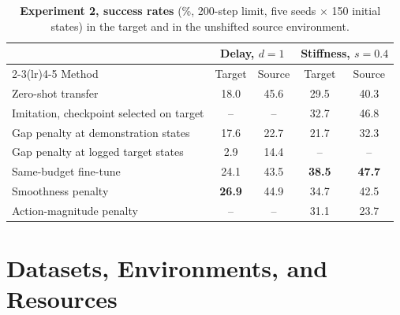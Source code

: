 \begin{table}[t]
  \centering
  \small
  \caption{\textbf{Experiment 2, success rates} (\%, 200-step limit, five seeds $\times$ 150 initial states) in the target and in the unshifted source environment.}
  \label{tab:sim2sim}
  \begin{tabular}{lcccc}
    \toprule
    & \multicolumn{2}{c}{Delay, $d=1$} & \multicolumn{2}{c}{Stiffness, $s=0.4$} \\
    \cmidrule(lr){2-3}\cmidrule(lr){4-5}
    Method & Target & Source & Target & Source \\
    \midrule
    Zero-shot transfer                          & 18.0 & 45.6 & 29.5 & 40.3 \\
    Imitation, checkpoint selected on target    & --   & --   & 32.7 & 46.8 \\
    Gap penalty at demonstration states         & 17.6 & 22.7 & 21.7 & 32.3 \\
    Gap penalty at logged target states         &  2.9 & 14.4 & --   & --   \\
    Same-budget fine-tune                       & 24.1 & 43.5 & \textbf{38.5} & \textbf{47.7} \\
    Smoothness penalty                          & \textbf{26.9} & 44.9 & 34.7 & 42.5 \\
    Action-magnitude penalty                    & --   & --   & 31.1 & 23.7 \\
    \bottomrule
  \end{tabular}
\end{table}

\section{Datasets, Environments, and Resources}

